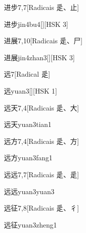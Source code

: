 \begin{entry}{进步}{7,7}[Radicais ⾡、⽌]
  \begin{phonetics}{进步}{jin4bu4}[][HSK 3]
  \end{phonetics}
\end{entry}

\begin{entry}{进展}{7,10}[Radicais ⾡、⼫]
  \begin{phonetics}{进展}{jin4zhan3}[][HSK 3]
  \end{phonetics}
\end{entry}

\begin{entry}{远}{7}[Radical ⾡]
  \begin{phonetics}{远}{yuan3}[][HSK 1]
  \end{phonetics}
\end{entry}

\begin{entry}{远天}{7,4}[Radicais ⾡、⼤]
  \begin{phonetics}{远天}{yuan3tian1}
  \end{phonetics}
\end{entry}

\begin{entry}{远方}{7,4}[Radicais ⾡、⽅]
  \begin{phonetics}{远方}{yuan3fang1}
  \end{phonetics}
\end{entry}

\begin{entry}{远远}{7,7}[Radicais ⾡、⾡]
  \begin{phonetics}{远远}{yuan3yuan3}
  \end{phonetics}
\end{entry}

\begin{entry}{远征}{7,8}[Radicais ⾡、⼻]
  \begin{phonetics}{远征}{yuan3zheng1}
  \end{phonetics}
\end{entry}


